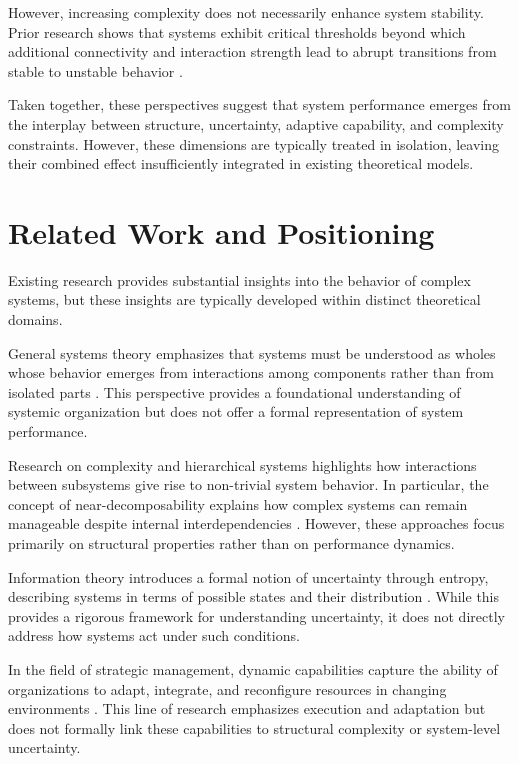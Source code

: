 \documentclass[11pt,a4paper]{article}
\theoremstyle{definition}
\begin{document}
However, increasing complexity does not necessarily enhance system stability.
Prior research shows that systems exhibit critical thresholds beyond which additional connectivity and interaction strength lead to abrupt transitions from stable to unstable behavior \parencite{may1972}.

Taken together, these perspectives suggest that system performance emerges from the interplay between structure, uncertainty, adaptive capability, and complexity constraints.
However, these dimensions are typically treated in isolation, leaving their combined effect insufficiently integrated in existing theoretical models.


\section{Related Work and Positioning}
\label{sec:related}

Existing research provides substantial insights into the behavior of complex systems, but these insights are typically developed within distinct theoretical domains.

General systems theory emphasizes that systems must be understood as wholes whose behavior emerges from interactions among components rather than from isolated parts \parencite{bertalanffy1968}.
This perspective provides a foundational understanding of systemic organization but does not offer a formal representation of system performance.

Research on complexity and hierarchical systems highlights how interactions between subsystems give rise to non-trivial system behavior.
In particular, the concept of near-decomposability explains how complex systems can remain manageable despite internal interdependencies \parencite{simon1962}.
However, these approaches focus primarily on structural properties rather than on performance dynamics.

Information theory introduces a formal notion of uncertainty through entropy, describing systems in terms of possible states and their distribution \parencite{shannon1948a, shannon1948b}.
While this provides a rigorous framework for understanding uncertainty, it does not directly address how systems act under such conditions.

In the field of strategic management, dynamic capabilities capture the ability of organizations to adapt, integrate, and reconfigure resources in changing environments \parencite{teece1997}.
This line of research emphasizes execution and adaptation but does not formally link these capabilities to structural complexity or system-level uncertainty.
\end{document}
